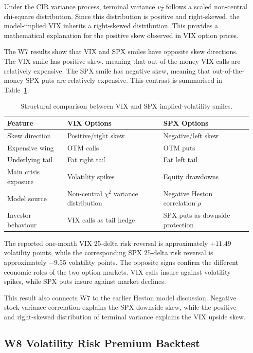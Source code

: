 Under the CIR variance process, terminal variance \(v_T\) follows a scaled non-central chi-square distribution. Since this distribution is positive and right-skewed, the model-implied VIX inherits a right-skewed distribution. This provides a mathematical explanation for the positive skew observed in VIX option prices.

The W7 results show that VIX and SPX smiles have opposite skew directions. The VIX smile has positive skew, meaning that out-of-the-money VIX calls are relatively expensive. The SPX smile has negative skew, meaning that out-of-the-money SPX puts are relatively expensive. This contrast is summarised in Table~\ref{tab:w7_smile_comparison}.

\begin{table}[htbp]
\centering
\begin{tabular}{lll}
\toprule
Feature & VIX Options & SPX Options \\
\midrule
Skew direction & Positive/right skew & Negative/left skew \\
Expensive wing & OTM calls & OTM puts \\
Underlying tail & Fat right tail & Fat left tail \\
Main crisis exposure & Volatility spikes & Equity drawdowns \\
Model source & Non-central \(\chi^2\) variance distribution & Negative Heston correlation \(\rho\) \\
Investor behaviour & VIX calls as tail hedge & SPX puts as downside protection \\
\bottomrule
\end{tabular}
\caption{Structural comparison between VIX and SPX implied-volatility smiles.}
\label{tab:w7_smile_comparison}
\end{table}

The reported one-month VIX 25-delta risk reversal is approximately \(+11.49\) volatility points, while the corresponding SPX 25-delta risk reversal is approximately \(-9.55\) volatility points. The opposite signs confirm the different economic roles of the two option markets. VIX calls insure against volatility spikes, while SPX puts insure against market declines.

This result also connects W7 to the earlier Heston model discussion. Negative stock-variance correlation explains the SPX downside skew, while the positive and right-skewed distribution of terminal variance explains the VIX upside skew.

\subsection{W8 Volatility Risk Premium Backtest}

